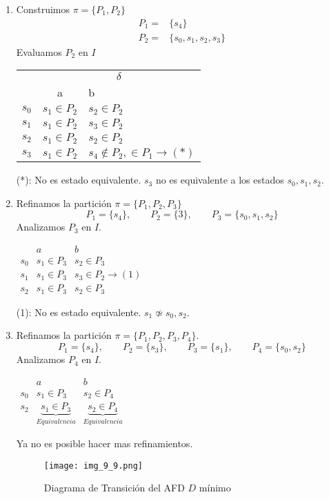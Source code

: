 \begin{enumerate}
\item Construimos $\pi=\{P_1,P_2\}$
\begin{align*}
P_1=&\{s_4\} \\
P_2=&\{s_0,s_1,s_2,s_3\}
\end{align*}
Evaluamos $P_2$ en $I$
\begin{center}
\begin{tabular}{c|cl}
	&\multicolumn{2}{c}{$\delta$}\\
	&a	&b	\\ \hline
$s_0$	&$s_1\in P_2$	&$s_2\in P_2$	\\
$s_1$	&$s_1\in P_2$	&$s_3\in P_2$	\\
$s_2$	&$s_1\in P_2$	&$s_2\in P_2$	\\
$s_3$	&$s_1\in P_2$	&$s_4\not\in P_2,\in P_1\rightarrow (*)$
\end{tabular}
\end{center}
(*): No es estado equivalente. $s_3$ no es equivalente a los estados $s_0,s_1,s_2$.

\item Refinamos la partición $\pi=\{P_1,P_2,P_3\}$
$$P_1=\{s_4\},\qquad P_2=\{3\},\qquad P_3=\{s_0,s_1,s_2\}$$
Analizamos $P_3$ en $I$.
\begin{center}
$\begin{array}{c|cl}
	&a	&b	\\ \hline
s_0	&s_1\in P_3	&s_2\in P_3	\\
s_1	&s_1\in P_3	&s_3\in P_2\rightarrow (1)	\\
s_2	&s_1\in P_3	&s_2\in P_3

\end{array}$
\end{center}
(1): No es estado equivalente. $s_1\not\simeq s_0,s_2$.
\item Refinamos la partición $\pi=\{P_1,P_2,P_3,P_4\}$.
$$P_1=\{s_4\},\qquad P_2=\{s_3\},\qquad P_3=\{s_1\},\qquad P_4=\{s_0,s_2\}$$
Analizamos $P_4$ en $I$.
\begin{center}
$\begin{array}{c|cc}
	&a	&b \\ \hline
s_0	&s_1\in P_3	&s_2\in P_4	\\
s_2	&\underbrace{s_1\in P_3}_{Equivalencia}	&\underbrace{s_2\in P_4}_{Equivalencia}
\end{array}$
\end{center}
Ya no es posible hacer mas refinamientos.

\begin{figure}[t!]
\centering
\texttt{[image: img\_9\_9.png]}
\caption{Diagrama de Transición del AFD $D$ mínimo}\label{img_9_9}
\end{figure}
\end{enumerate}
